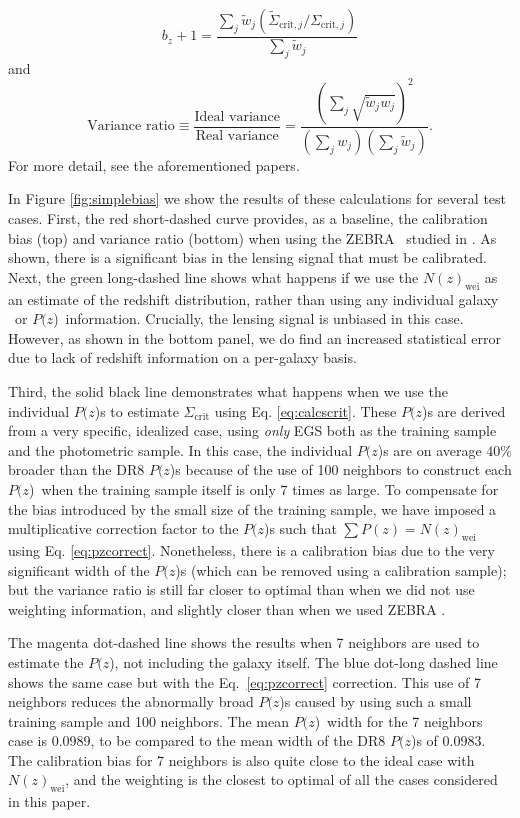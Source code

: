 \documentclass[12pt,preprint]{aastex}
\newcommand{\pofz}{$P(z$)}
\begin{document}
\noindent
\begin{equation} \label{eq:lensbias}
b_z + 1 = \frac{\sum_j \tilde{w}_j (\tilde{\Sigma}_{\mathrm{crit},j}
   / \Sigma_{\mathrm{crit},j})}{\sum_j \tilde{w}_j}
\end{equation}
and
\begin{equation} \label{eq:lensweight}
\textrm{Variance ratio}  \equiv \frac{\textrm{Ideal variance}}{\textrm{Real
     variance}} = \frac{(\sum_j \sqrt{\tilde{w}_j w_j})^2}{(\sum_j
     w_j)(\sum_j \tilde{w}_j)}.
\end{equation}
For more detail, see the aforementioned papers.

In Figure \ref{fig:simplebias} we show the results of these calculations for
several test cases.  First, the red short-dashed curve provides, as a baseline,
the calibration bias (top) and variance ratio (bottom) when using the ZEBRA
\photoz\ studied in \citet{Nakajima11}.  As shown, there is a
significant bias in the lensing signal that must be calibrated.
Next, the green long-dashed line shows what happens if we use the
$N(z)_\mathrm{wei}$ as an estimate of the redshift distribution, rather than
using any individual galaxy \photoz\ or \pofz\ information.  Crucially, the
lensing signal is unbiased in this case. However, as shown in the bottom
panel, we do find an increased
statistical error due to lack of redshift information on a per-galaxy basis.

Third, the solid black line demonstrates what happens when we use the individual
\pofz s to estimate $\Sigma_\mathrm{crit}$ using Eq. \ref{eq:calcscrit}.  These
\pofz s are derived from a very specific, idealized case, using {\em only} EGS
both as the training sample and the photometric sample.  In this case, the
individual \pofz s are on average $40\%$ broader than the DR8 \pofz s because of
the use of 100 neighbors to construct each \pofz\ when the training sample
itself is only $7$ times as large.  To compensate for the bias introduced by
the small size of the training sample, we have imposed a multiplicative
correction factor to the \pofz s such that $\sum P(z) = N(z)_\mathrm{wei}$ using
Eq. \ref{eq:pzcorrect}.  Nonetheless, there is a calibration bias due to the
very significant width of the \pofz s (which can be removed using a calibration
sample); but the variance ratio is still far closer to optimal than when we did
not use weighting information, and slightly closer than when we used ZEBRA
\photoz.  

The magenta dot-dashed line shows the results when 7 neighbors are used to
estimate the \pofz, not including the galaxy itself. The blue dot-long dashed
line shows the same case but with the Eq.~\ref{eq:pzcorrect} correction.  This
use of 7 neighbors reduces the abnormally broad \pofz s caused by using such a
small training sample and 100 neighbors.  The mean \pofz\ width for the 7
neighbors case is 0.0989, to be compared to the mean width of the DR8 \pofz s of
0.0983. The calibration bias for 7 neighbors is also quite close to the ideal
case with $N(z)_\mathrm{wei}$, and the weighting is the closest to optimal of
all the cases considered in this paper.
\end{document}
